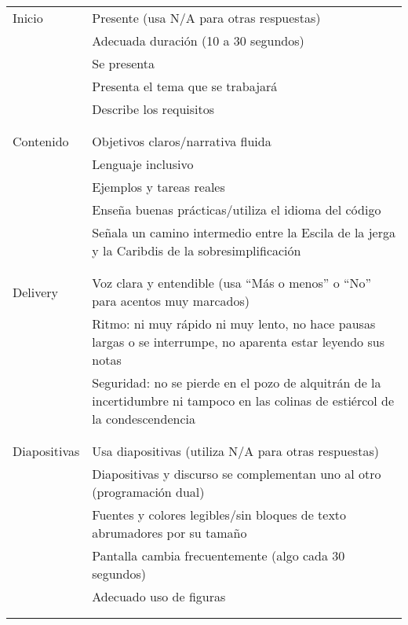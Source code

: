 \noindent
\begin{longtable}{p{}p{}}

  Inicio
  & Presente (usa N/A para otras respuestas) \\
  & Adecuada duración (10 a 30 segundos) \\
  & Se presenta \\
  & Presenta el tema que se trabajará \\
  & Describe los requisitos \\
  \\ [-1.5ex] \hline \\ [-1.5ex]

  Contenido
  & Objetivos claros/narrativa fluida \\
  & Lenguaje inclusivo \\
  & Ejemplos y tareas reales \\
  & Enseña buenas prácticas/utiliza el idioma del código \\
  & Señala un camino intermedio entre la Escila de la jerga y la Caribdis de la sobresimplificación \\
  \\ [-1.5ex] \hline \\ [-1.5ex]

  Delivery
  & Voz clara y entendible (usa ``Más o menos'' o ``No'' para acentos muy marcados) \\
  & Ritmo: ni muy rápido ni muy lento, no hace pausas largas o se interrumpe, no aparenta estar leyendo sus notas \\
  & Seguridad: no se pierde en el pozo de alquitrán de la incertidumbre ni tampoco en las colinas de estiércol de la condescendencia \\
  \\ [-1.5ex] \hline \\ [-1.5ex]

  Diapositivas
  & Usa diapositivas (utiliza N/A para otras respuestas) \\
  & Diapositivas y discurso se complementan uno al otro (programación dual) \\
  & Fuentes y colores legibles/sin bloques de texto abrumadores por su tamaño\\
  & Pantalla cambia frecuentemente (algo cada 30 segundos) \\
  & Adecuado uso de figuras \\
  \\ [-1.5ex] \hline \\ [-1.5ex]


\end{longtable}
